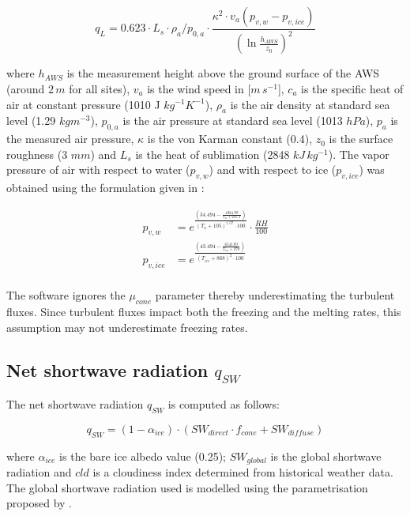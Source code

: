 \documentclass[utf8]{frontiersSCNS}
\begin{document}
\begin{equation}
	q_{L}= 0.623 \cdot L_s \cdot \rho_{a}/p_{0,a} \cdot \frac{\kappa^2 \cdot
	v_a(p_{v,w}-p_{v,ice})}{{(\ln{\frac{h_{AWS}}{z_{0}}})}^2}
\end{equation}

where $h_{AWS}$ is the measurement height above the ground surface of the AWS (around $2\,m$ for all sites),
$v_a$ is the wind speed in [$m\,s^{-1}$], $c_a$ is the specific heat of air at constant pressure (1010 J
$kg^{-1} K^{-1}$), $\rho_{a}$ is the air density at standard sea level (1.29 $kg m^{-3}$), $p_{0,a}$ is the air
pressure at standard sea level (1013 $hPa$), $p_{a}$ is the measured air pressure, $\kappa$ is the von Karman
constant (0.4), $z_{0}$ is the surface roughness (3 $mm$) and $L_s$ is the heat of sublimation (2848
$kJ\,kg^{-1}$).  The vapor pressure of air with respect to water ($p_{v,w}$) and with respect to ice
($p_{v,ice}$) was obtained using the formulation given in \cite{huang_2018} :

\begin{equation}
	\begin{split}
		p_{v,w}&=e^{\frac{(34.494 - \frac{4924.99}{T_{a} + 237.1})}{(T_a + 105)^{1.57} \cdot 100}} \cdot \frac{RH}{100} \\
		p_{v,ice}&=e^{\frac{(43.494 - \frac{6545.89}{T_{ice} + 278})}{(T_{ice} + 868)^{2} \cdot 100}} \\
	\end{split} \label{eqn:vp}
\end{equation}

The software ignores the $\mu_{cone}$ parameter thereby underestimating the turbulent fluxes. Since turbulent
fluxes impact both the freezing and the melting rates, this assumption may not underestimate freezing rates.

\subsection{Net shortwave radiation \texorpdfstring{$q_{SW}$}{Lg}}
\label{sec:SW}

The net shortwave radiation $q_{SW}$ is computed as follows:

\begin{equation} q_{SW} = (1- \alpha_{ice}) \cdot ( SW_{direct} \cdot f_{cone} + SW_{diffuse})
\label{eqn:SW} \end{equation}

where $\alpha_{ice}$ is the bare ice albedo value (0.25); $SW_{global}$ is the global shortwave radiation and
$cld$ is a cloudiness index determined from historical weather data. The global shortwave radiation used is
modelled using the parametrisation proposed by \cite{Woolf_1968}.
\end{document}
